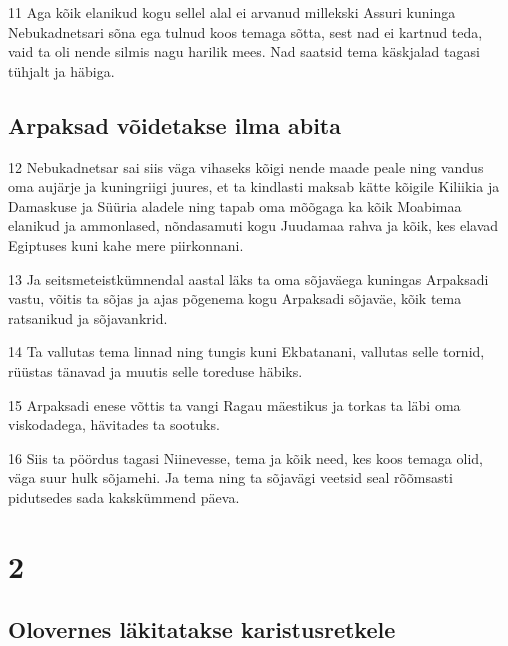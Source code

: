 \par 11 Aga kõik elanikud kogu sellel alal ei arvanud millekski Assuri kuninga Nebukadnetsari sõna ega tulnud koos temaga sõtta, sest nad ei kartnud teda, vaid ta oli nende silmis nagu harilik mees. Nad saatsid tema käskjalad tagasi tühjalt ja häbiga.

\section*{Arpaksad võidetakse ilma abita}

\par 12 Nebukadnetsar sai siis väga vihaseks kõigi nende maade peale ning vandus oma aujärje ja kuningriigi juures, et ta kindlasti maksab kätte kõigile Kiliikia ja Damaskuse ja Süüria aladele ning tapab oma mõõgaga ka kõik Moabimaa elanikud ja ammonlased, nõndasamuti kogu Juudamaa rahva ja kõik, kes elavad Egiptuses kuni kahe mere piirkonnani.
\par 13 Ja seitsmeteistkümnendal aastal läks ta oma sõjaväega kuningas Arpaksadi vastu, võitis ta sõjas ja ajas põgenema kogu Arpaksadi sõjaväe, kõik tema ratsanikud ja sõjavankrid.
\par 14 Ta vallutas tema linnad ning tungis kuni Ekbatanani, vallutas selle tornid, rüüstas tänavad ja muutis selle toreduse häbiks.
\par 15 Arpaksadi enese võttis ta vangi Ragau mäestikus ja torkas ta läbi oma viskodadega, hävitades ta sootuks.
\par 16 Siis ta pöördus tagasi Niinevesse, tema ja kõik need, kes koos temaga olid, väga suur hulk sõjamehi. Ja tema ning ta sõjavägi veetsid seal rõõmsasti pidutsedes sada kakskümmend päeva.


\chapter{2}

\section*{Olovernes läkitatakse karistusretkele}

